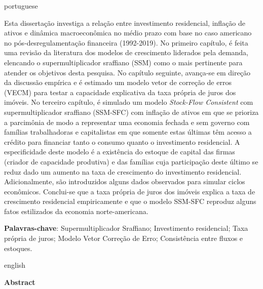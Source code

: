 \documentclass[12pt,openright,oneside,a4paper,brazil,main=english,sumario=tradicional]{gpsabntex}
\renewcommand{\ABNTEXchapterfont}{\rmfamily\bfseries}
\numberwithin{listing}{chapter}
\begin{document}
\begin{resumo}
\thispagestyle{empty} %
\begin{otherlanguage*}{portuguese}

Esta dissertação investiga a relação entre investimento residencial, inflação de ativos e dinâmica macroeconômica no médio prazo com base no caso americano no pós-desregulamentação financeira (1992-2019).
No primeiro capítulo, é feita uma revisão da literatura dos modelos de crescimento liderados pela demanda, elencando o supermultiplicador sraffiano (SSM) como o mais pertinente para atender os objetivos desta pesquisa.
No capítulo seguinte, avança-se em direção da discussão empírica e é estimado um modelo vetor de correção de erros (VECM) para testar a capacidade explicativa da taxa própria de juros dos imóveis.
No terceiro capítulo, é simulado um modelo \textit{Stock-Flow Consistent} com supermultiplicador sraffiano (SSM-SFC) com inflação de ativos em que se
prioriza a parcimônia de modo a representar uma economia fechada e sem governo com famílias trabalhadoras e capitalistas em que somente estas últimas têm acesso a crédito para financiar tanto o consumo quanto o investimento residencial.
A especificidade deste modelo é a existência do estoque de capital das firmas (criador de capacidade produtiva) e das famílias
cuja participação deste último se reduz dado um aumento na taxa de crescimento do investimento residencial.
Adicionalmente, são introduzidos alguns dados observados para simular ciclos econômicos.
Conclui-se que a taxa própria de juros dos imóveis explica a taxa de crescimento residencial empiricamente e que o modelo SSM-SFC reproduz alguns fatos estilizados da economia norte-americana.



\vspace{\onelineskip}

\noindent\textbf{Palavras-chave}: 
	Supermultiplicador Sraffiano; 
	Investimento residencial; 
	Taxa própria de juros; 
	Modelo Vetor Correção de Erro;
	Consistência entre fluxos e estoques.
\end{otherlanguage*}
\newpage

\begin{otherlanguage*}{english}
	\thispagestyle{empty}
	\begin{center}{\ABNTEXchapterfont\huge Abstract}\end{center}
	

\end{otherlanguage*}
\end{resumo}
\end{document}
